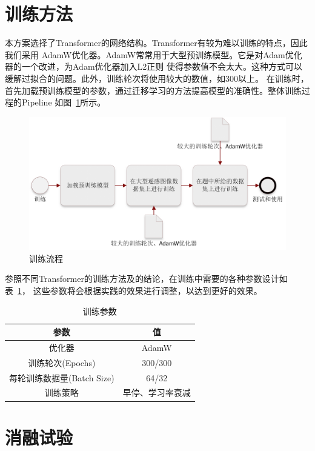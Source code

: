 \documentclass[a4paper,twoside,zihao=5,UTF8]{ctexrep}
\begin{document}
\section{训练方法}
本方案选择了Transformer的网络结构。Transformer有较为难以训练的特点，因此我们采用
AdamW优化器。AdamW常常用于大型预训练模型。它是对Adam优化器的一个改进，为Adam优化器加入L2正则
使得参数值不会太大。这种方式可以缓解过拟合的问题。此外，训练轮次将使用较大的数值，如300以上。
在训练时，首先加载预训练模型的参数，通过迁移学习的方法提高模型的准确性。整体训练过程的Pipeline
如图~\ref{fig:trainpipe}所示。

\begin{figure}[htbp]
    \includegraphics[width=\textwidth]{train.png}
    \centering
    \caption{训练流程}
    \label{fig:trainpipe}
\end{figure}

参照不同Transformer的训练方法及\cite{howtotrain}的结论，在训练中需要的各种参数设计如表~\ref{tbl:train}，
这些参数将会根据实践的效果进行调整，以达到更好的效果。

\begin{table}[htbp]
    \centering
    \caption{训练参数}
    \label{tbl:train}
    \renewcommand\arraystretch{1.5}
    \begin{tabular}{c|c}
        \toprule
        \hline
        参数 & 值 \\
        \hline
        优化器 & AdamW \\
        训练轮次(Epochs) & 300/300 \\
        每轮训练数据量(Batch Size) & 64/32 \\
        训练策略 & 早停、学习率衰减 \\
        \hline
        \bottomrule
    \end{tabular}
\end{table}

\section{消融试验}
\end{document}
